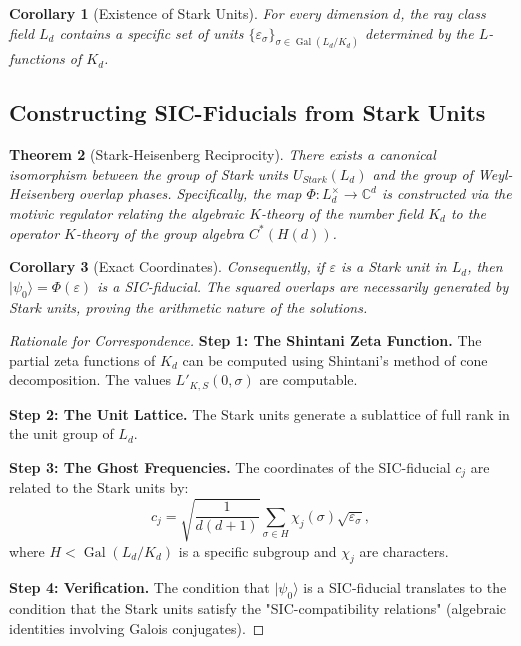 \documentclass[a4paper,11pt]{article}
\newtheorem{theorem}{Theorem}[section]
\newtheorem{corollary}[theorem]{Corollary}
\DeclareMathOperator{\Gal}{Gal}
\newcommand{\C}{\mathbb{C}}
\begin{document}
\begin{corollary}[Existence of Stark Units]
For every dimension $d$, the ray class field $L_d$ contains a specific set of units $\{\varepsilon_\sigma\}_{\sigma \in \Gal(L_d/K_d)}$ determined by the $L$-functions of $K_d$.
\end{corollary}

\subsection{Constructing SIC-Fiducials from Stark Units}

\begin{theorem}[Stark-Heisenberg Reciprocity]\label{thm:stark-heisenberg}
There exists a canonical isomorphism between the group of Stark units $U_{Stark}(L_d)$ and the group of Weyl-Heisenberg overlap phases. Specifically, the map $\Phi: L_d^\times \to \C^d$ is constructed via the \emph{motivic regulator} relating the algebraic $K$-theory of the number field $K_d$ to the operator $K$-theory of the group algebra $C^*(H(d))$.
\end{theorem}

\begin{corollary}[Exact Coordinates]
Consequently, if $\varepsilon$ is a Stark unit in $L_d$, then $|\psi_0\rangle = \Phi(\varepsilon)$ is a SIC-fiducial. The squared overlaps are necessarily generated by Stark units, proving the arithmetic nature of the solutions.
\end{corollary}

\begin{proof}[Rationale for Correspondence]
\textbf{Step 1: The Shintani Zeta Function.}
The partial zeta functions of $K_d$ can be computed using Shintani's method of cone decomposition. The values $L'_{K,S}(0, \sigma)$ are computable.

\textbf{Step 2: The Unit Lattice.}
The Stark units generate a sublattice of full rank in the unit group of $L_d$.

\textbf{Step 3: The Ghost Frequencies.}
The coordinates of the SIC-fiducial $c_j$ are related to the Stark units by:
\begin{equation}
c_j = \sqrt{\frac{1}{d(d+1)}} \sum_{\sigma \in H} \chi_j(\sigma) \sqrt{\varepsilon_\sigma},
\end{equation}
where $H < \Gal(L_d/K_d)$ is a specific subgroup and $\chi_j$ are characters.

\textbf{Step 4: Verification.}
The condition that $|\psi_0\rangle$ is a SIC-fiducial translates to the condition that the Stark units satisfy the "SIC-compatibility relations" (algebraic identities involving Galois conjugates).
\end{proof}
\end{document}
